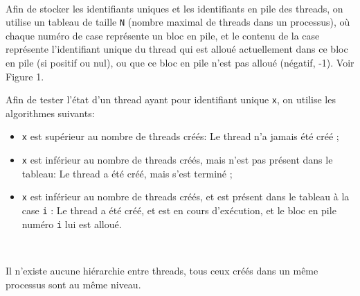 \documentclass{article}
\begin{document}
			~\par{Afin de stocker les identifiants uniques et les identifiants en pile des threads, on utilise un tableau de taille \texttt{N} (nombre maximal de threads dans un processus), où chaque numéro de case représente un bloc en pile, et le contenu de la case représente l'identifiant unique du thread qui est alloué actuellement dans ce bloc en pile (si positif ou nul), ou que ce bloc en pile n'est pas alloué (négatif, -1). Voir Figure 1.}
			~\par{Afin de tester l'état d'un thread ayant pour identifiant unique \texttt{x}, on utilise les algorithmes suivants: }
				\begin{itemize}
					\item{\texttt{x} est supérieur au nombre de threads créés: } Le thread n'a jamais été créé ;
					\item{\texttt{x} est inférieur au nombre de threads créés, mais n'est pas présent dans le tableau: } Le thread a été créé, mais s'est terminé ;
					\item{\texttt{x} est inférieur au nombre de threads créés, et est présent dans le tableau à la case \texttt{i} : Le thread a été créé, et est en cours d'exécution, et le bloc en pile numéro \texttt{i} lui est alloué.}
				\end{itemize}
				~\par{Il n'existe aucune hiérarchie entre threads, tous ceux créés dans un même processus sont au même niveau.}
\end{document}
